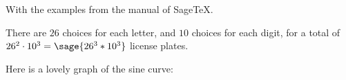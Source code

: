 \documentclass{article}
\begin{document}
With the examples from the manual of SageTeX.

There are $26$ choices for each letter, and $10$ choices for
each digit, for a total of  $26^2 \cdot 10^3 = \sage{26^3*10^3}$
license plates.

Here is a lovely graph of the sine curve:
\end{document}
